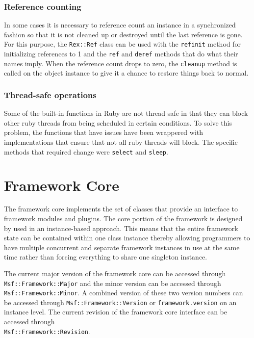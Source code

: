 \documentclass{report}
\begin{document}
            \subsubsection{Reference counting}

\par
In some cases it is necessary to reference count an instance in a
synchronized fashion so that it is not cleaned up or destroyed until
the last reference is gone.  For this purpose, the \texttt{Rex::Ref}
class can be used with the \texttt{refinit} method for initializing
references to 1 and the \texttt{ref} and \texttt{deref} methods that
do what their names imply.  When the reference count drops to zero,
the \texttt{cleanup} method is called on the object instance to give
it a chance to restore things back to normal.

            \subsubsection{Thread-safe operations}

\par
Some of the built-in functions in Ruby are not thread safe in that
they can block other ruby threads from being scheduled in certain
conditions.  To solve this problem, the functions that have issues
have been wrappered with implementations that ensure that not all
ruby threads will block.  The specific methods that required change
were \texttt{select} and \texttt{sleep}.

    \section{Framework Core}

\par
The framework core implements the set of classes that provide an
interface to framework modules and plugins.  The core portion of the
framework is designed by used in an instance-based approach.  This
means that the entire framework state can be contained within one
class instance thereby allowing programmers to have multiple
concurrent and separate framework instances in use at the same time
rather than forcing everything to share one singleton instance.

\par
The current major version of the framework core can be accessed
through \texttt{Msf::Framework::Major} and the minor version can be
accessed through \texttt{Msf::Framework::Minor}.  A combined version
of these two version numbers can be accessed through
\texttt{Msf::Framework::Version} or \texttt{framework.version} on an
instance level.  The current revision of the framework core
interface can be accessed through
\\\texttt{Msf::Framework::Revision}.
\end{document}
